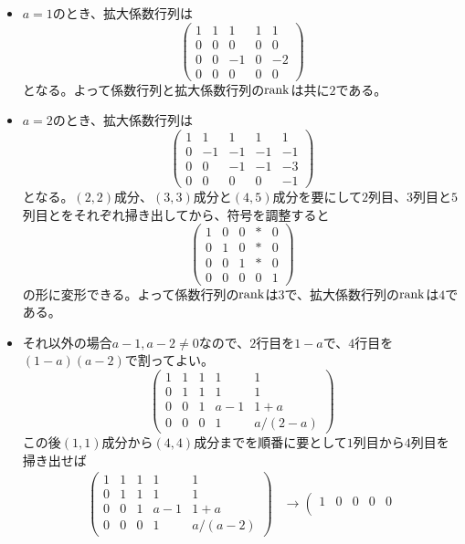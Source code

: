 \begin{itemize}
\item $a = 1$のとき、拡大係数行列は
\[
\left(\begin{array}{rrrr|r}
1 & 1 & 1 & 1 & 1 \\
0 & 0 & 0 & 0 & 0 \\
0 & 0 & -1 & 0 & - 2 \\
0 & 0 & 0 & 0 & 0
\end{array}\right)
\]
となる。よって係数行列と拡大係数行列の$\operatorname{rank}$は共に$2$である。
\item $a = 2$のとき、拡大係数行列は
\[
\left(\begin{array}{rrrr|r}
1 & 1 & 1 & 1 & 1 \\
0 & -1 & -1 & -1 & -1 \\
0 & 0 & -1 & -1 & -3 \\
0 & 0 & 0 & 0 & -1
\end{array}\right)
\]
となる。$(2, 2)$成分、$(3, 3)$成分と$(4, 5)$成分を要にして$2$列目、$3$列目と$5$列目とをそれぞれ掃き出してから、符号を調整すると
\[
\left(\begin{array}{cccc|c}
1 & 0 & 0 & * & 0 \\
0 & 1 & 0 & * & 0 \\
0 & 0 & 1 & * & 0 \\
0 & 0 & 0 & 0 & 1
\end{array}\right)
\]
の形に変形できる。よって係数行列の$\operatorname{rank}$は$3$で、拡大係数行列の$\operatorname{rank}$は$4$である。
\item それ以外の場合$a - 1, a - 2 \neq 0$なので、$2$行目を$1 - a$で、$4$行目を$(1 - a)(a - 2)$で割ってよい。
\[
\left(\begin{array}{cccc|c}
1 & 1 & 1 & 1 & 1 \\
0 & 1 & 1 & 1 & 1 \\
0 & 0 & 1 & a - 1 & 1 + a \\
0 & 0 & 0 & 1 & a/(2 - a)
\end{array}\right)
\]
この後$(1, 1)$成分から$(4, 4)$成分までを順番に要として$1$列目から$4$列目を掃き出せば
\begin{align*}
\left(\begin{array}{cccc|c}
1 & 1 & 1 & 1 & 1 \\
0 & 1 & 1 & 1 & 1 \\
0 & 0 & 1 & a - 1 & 1 + a \\
0 & 0 & 0 & 1 & a/(a - 2)
\end{array}\right)
&\rightarrow
\left(\begin{array}{cccc|c}
1 & 0 & 0 & 0 & 0 \\

\end{array}
\end{align*}
\end{itemize}
